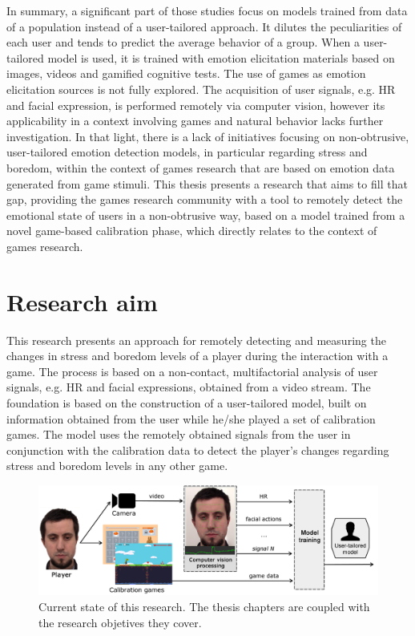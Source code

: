 In summary, a significant part of those studies focus on models trained from data of a population instead of a user-tailored approach. It dilutes the peculiarities of each user and tends to predict the average behavior of a group. When a user-tailored model is used, it is trained with emotion elicitation materials based on images, videos and gamified cognitive tests. The use of games as emotion elicitation sources is not fully explored. The acquisition of user signals, e.g. HR and facial expression, is performed remotely via computer vision, however its applicability in a context involving games and natural behavior lacks further investigation. In that light, there is a lack of initiatives focusing on non-obtrusive, user-tailored emotion detection models, in particular regarding stress and boredom, within the context of games research that are based on emotion data generated from game stimuli. This thesis presents a research that aims to fill that gap, providing the games research community with a tool to remotely detect the emotional state of users in a non-obtrusive way, based on a model trained from a novel game-based calibration phase, which directly relates to the context of games research.

\section{Research aim}

This research presents an approach for remotely detecting and measuring the changes in stress and boredom levels of a player during the interaction with a game. The process is based on a non-contact, multifactorial analysis of user signals, e.g. HR and facial expressions, obtained from a video stream. The foundation is based on the construction of a user-tailored model, built on information obtained from the user while he/she played a set of calibration games. The model uses the remotely obtained signals from the user in conjunction with the calibration data to detect the player's changes regarding stress and boredom levels in any other game.

\begin{figure}[h]
    \centering
    \includegraphics[width=\textwidth]{figures/user-tailored-calibration.png}
    \caption{Current state of this research. The thesis chapters are coupled with the research objetives they cover.}
    \label{fig:user-tailored-calibration}
\end{figure}

